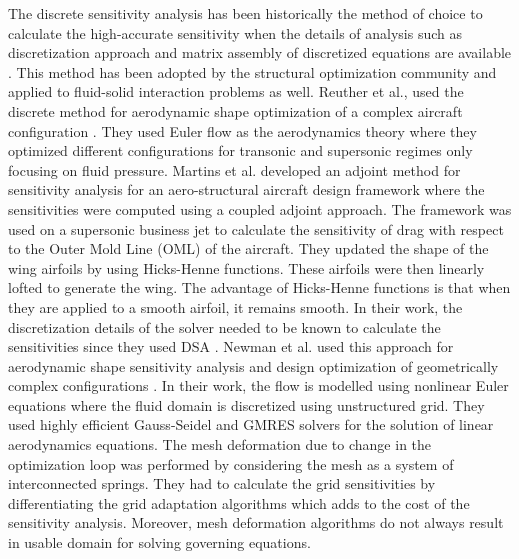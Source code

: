 The discrete sensitivity analysis has been historically the method of choice to calculate the high-accurate sensitivity when the details of analysis such as discretization approach and matrix assembly of discretized equations are available \cite{arora1979methods}. This method has been adopted by the structural optimization community and applied to fluid-solid interaction problems as well. Reuther et al., used the discrete method for aerodynamic shape optimization of a complex aircraft configuration \cite{reuther1999constrained}. They used Euler flow as the aerodynamics theory where they optimized different configurations for transonic and supersonic regimes only focusing on fluid pressure. Martins et al. developed an adjoint method for sensitivity analysis for an aero-structural aircraft design framework where the sensitivities were computed using a coupled adjoint approach. The framework was used on a supersonic business jet to calculate the sensitivity of drag with respect to the Outer Mold Line (OML) of the aircraft. They updated the shape of the wing airfoils by using Hicks-Henne functions. These airfoils were then linearly lofted to generate the wing. The advantage of Hicks-Henne functions is that when they are applied to a smooth airfoil, it remains smooth. In their work, the discretization details of the solver needed to be known to calculate the sensitivities since they used DSA \cite{martins2005coupled}. Newman et al. used this approach for aerodynamic shape sensitivity analysis and design optimization of geometrically complex configurations \cite{newman1997aerodynamic}. In their work, the flow is modelled using nonlinear Euler equations where the fluid domain is discretized using unstructured grid. They used highly efficient Gauss-Seidel and GMRES solvers for the solution of linear aerodynamics equations. The mesh deformation due to change in the optimization loop was performed by considering the mesh as a system of interconnected springs. They had to calculate the grid sensitivities by differentiating the grid adaptation algorithms which adds to the cost of the sensitivity analysis. Moreover, mesh deformation algorithms do not always result in usable domain for solving governing equations.

